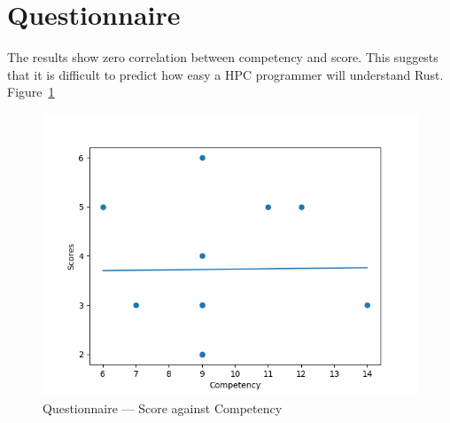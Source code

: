 \section{Questionnaire}
The results show zero correlation between competency and score. This suggests that it is difficult to predict how easy a HPC programmer will understand Rust. Figure~\ref{fig:questions}

\begin{figure}[h]
\centering
\includegraphics[width=.8\linewidth]{figs/questions/scatter.png}
\caption{Questionnaire --- Score against Competency}\label{fig:questions}
\end{figure}
